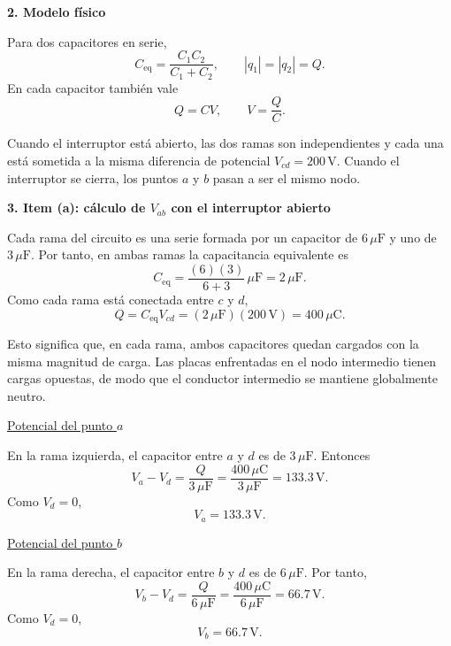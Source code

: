 \documentclass[11pt]{article}
\begin{document}
\textbf{2. Modelo f\'isico}

Para dos capacitores en serie,
\begin{equation*}
    C_{\text{eq}}=\frac{C_1C_2}{C_1+C_2},
    \qquad
    |q_1|=|q_2|=Q.
\end{equation*}
En cada capacitor tambi\'en vale
\begin{equation*}
    Q=CV,
    \qquad
    V=\frac{Q}{C}.
\end{equation*}

Cuando el interruptor est\'a abierto, las dos ramas son independientes y cada una est\'a sometida a la misma diferencia de potencial $V_{cd}=200\,\text{V}$. Cuando el interruptor se cierra, los puntos $a$ y $b$ pasan a ser el mismo nodo.

\textbf{3. Item (a): c\'alculo de $V_{ab}$ con el interruptor abierto}

Cada rama del circuito es una serie formada por un capacitor de $6\,\mu\text{F}$ y uno de $3\,\mu\text{F}$. Por tanto, en ambas ramas la capacitancia equivalente es
\begin{equation*}
    C_{\text{eq}}=\frac{(6)(3)}{6+3}\,\mu\text{F}=2\,\mu\text{F}.
\end{equation*}
Como cada rama est\'a conectada entre $c$ y $d$,
\begin{equation*}
    Q=C_{\text{eq}}V_{cd}=(2\,\mu\text{F})(200\,\text{V})=400\,\mu\text{C}.
\end{equation*}

Esto significa que, en cada rama, ambos capacitores quedan cargados con la misma magnitud de carga. Las placas enfrentadas en el nodo intermedio tienen cargas opuestas, de modo que el conductor intermedio se mantiene globalmente neutro.

\medskip
\underline{Potencial del punto $a$}

En la rama izquierda, el capacitor entre $a$ y $d$ es de $3\,\mu\text{F}$. Entonces
\begin{equation*}
    V_a-V_d=\frac{Q}{3\,\mu\text{F}}=\frac{400\,\mu\text{C}}{3\,\mu\text{F}}=133.3\,\text{V}.
\end{equation*}
Como $V_d=0$,
\begin{equation*}
    V_a=133.3\,\text{V}.
\end{equation*}

\underline{Potencial del punto $b$}

En la rama derecha, el capacitor entre $b$ y $d$ es de $6\,\mu\text{F}$. Por tanto,
\begin{equation*}
    V_b-V_d=\frac{Q}{6\,\mu\text{F}}=\frac{400\,\mu\text{C}}{6\,\mu\text{F}}=66.7\,\text{V}.
\end{equation*}
Como $V_d=0$,
\begin{equation*}
    V_b=66.7\,\text{V}.
\end{equation*}
\end{document}
